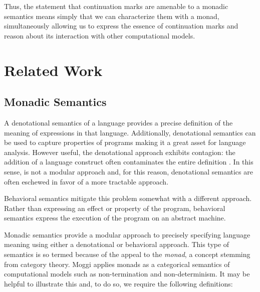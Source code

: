 \documentclass[ms]{byuprop}
\newcounter{definition}
\begin{document}

Thus, the statement that continuation marks are amenable to a monadic semantics means
simply that we can characterize them with a monad, simultaneously allowing us to express
the essence of continuation marks and reason about its interaction with other
computational models.


\section{Related Work}

\subsection{Monadic Semantics}

A denotational semantics of a language provides a precise definition of the meaning of
expressions in that language. Additionally, denotational semantics can be used to capture
properties of programs making it a great asset for language analysis. However useful, the
denotational approach exhibits contagion: the addition of a language construct often
contaminates the entire definition \cite{liang2009modular}. In this sense, is not a
modular approach and, for this reason, denotational semantics are often eschewed in favor
of a more tractable approach.

Behavioral semantics mitigate this problem somewhat with a different approach. Rather than
expressing an effect or property of the program, behavioral semantics express the
execution of the program on an abstract machine.


Monadic semantics provide a modular approach to precisely specifying language meaning
using either a denotational or behavioral approach. This type of semantics is so termed
because of the appeal to the \emph{monad}, a concept stemming from category theory. Moggi
\cite{moggi1989computational} applies monads as a categorical semantics of computational
models such as non-termination and non-determinism. It may be helpful to illustrate this
and, to do so, we require the following definitions:
\end{document}
